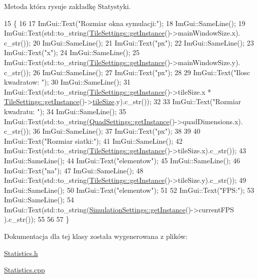 Metoda która rysuje zakładkę Statystyki. 
\begin{DoxyCode}
15 \{
16 
17     ImGui::Text(\textcolor{stringliteral}{"Rozmiar okna symulacji:"});
18     ImGui::SameLine();
19     ImGui::Text(std::to\_string(\mbox{\hyperlink{class_tile_settings_a003ae6e78b97855c8592b2b4c0818914}{TileSettings::getInstance}}()->mainWindowSize.x).
      c\_str());
20     ImGui::SameLine();
21     ImGui::Text(\textcolor{stringliteral}{"px"});
22     ImGui::SameLine();
23     ImGui::Text(\textcolor{stringliteral}{"x"});
24     ImGui::SameLine();
25     ImGui::Text(std::to\_string(\mbox{\hyperlink{class_tile_settings_a003ae6e78b97855c8592b2b4c0818914}{TileSettings::getInstance}}()->mainWindowSize.y).
      c\_str());
26     ImGui::SameLine();
27     ImGui::Text(\textcolor{stringliteral}{"px"});
28 
29     ImGui::Text(\textcolor{stringliteral}{"Ilosc kwadratow: "});
30     ImGui::SameLine();
31     ImGui::Text(std::to\_string(\mbox{\hyperlink{class_tile_settings_a003ae6e78b97855c8592b2b4c0818914}{TileSettings::getInstance}}()->tileSize.x * 
      \mbox{\hyperlink{class_tile_settings_a003ae6e78b97855c8592b2b4c0818914}{TileSettings::getInstance}}()->\mbox{\hyperlink{class_tile_settings_ae4be54be3619d21d536ce13b7354f165}{tileSize}}.y).c\_str());
32 
33     ImGui::Text(\textcolor{stringliteral}{"Rozmiar kwadratu: "});
34     ImGui::SameLine();
35     ImGui::Text(std::to\_string(\mbox{\hyperlink{class_quad_settings_a20d7cfd0c56c11adcdf75c5e3011de67}{QuadSettings::getInstance}}()->quadDimensions.x).
      c\_str());
36     ImGui::SameLine();
37     ImGui::Text(\textcolor{stringliteral}{"px"});
38 
39 
40     ImGui::Text(\textcolor{stringliteral}{"Rozmiar siatki:"});
41     ImGui::SameLine();
42     ImGui::Text(std::to\_string(\mbox{\hyperlink{class_tile_settings_a003ae6e78b97855c8592b2b4c0818914}{TileSettings::getInstance}}()->tileSize.x).c\_str());
43     ImGui::SameLine();
44     ImGui::Text(\textcolor{stringliteral}{"elementow"});
45     ImGui::SameLine();
46     ImGui::Text(\textcolor{stringliteral}{"na"});
47     ImGui::SameLine();
48     ImGui::Text(std::to\_string(\mbox{\hyperlink{class_tile_settings_a003ae6e78b97855c8592b2b4c0818914}{TileSettings::getInstance}}()->tileSize.y).c\_str());
49     ImGui::SameLine();
50     ImGui::Text(\textcolor{stringliteral}{"elementow"});
51 
52     ImGui::Text(\textcolor{stringliteral}{"FPS:"});
53     ImGui::SameLine();
54     ImGui::Text(std::to\_string(\mbox{\hyperlink{class_simulation_settings_ab69bcd8bb611656b17d1f655d09a3004}{SimulationSettings::getInstance}}()->currentFPS
      ).c\_str());
55 
56 
57 \}
\end{DoxyCode}


Dokumentacja dla tej klasy została wygenerowana z plików\+:\begin{DoxyCompactItemize}
\item 
\mbox{\hyperlink{_statistics_8h}{Statistics.\+h}}\item 
\mbox{\hyperlink{_statistics_8cpp}{Statistics.\+cpp}}\end{DoxyCompactItemize}
